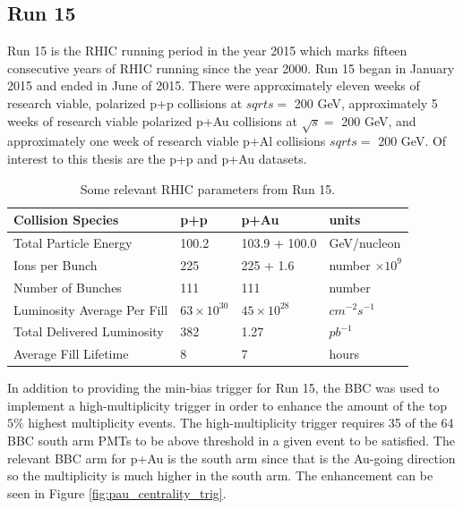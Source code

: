 \subsection{Run 15}
\label{sec:Run_15}
Run 15 is the RHIC running period in the year 2015  which marks fifteen consecutive years of RHIC running since the year 2000. Run 15 began in January 2015 and ended in June of 2015. There were approximately eleven weeks of research viable, polarized p+p collisions at $sqrt{s}=$ 200 GeV, approximately 5 weeks of research viable polarized p+Au collisions at $\sqrt{s}=$ 200 GeV, and approximately one week of research viable p+Al collisions $sqrt{s}=$ 200 GeV. Of interest to this thesis are the p+p and p+Au datasets. 
\begin{table}[h!]
\caption{Some relevant RHIC parameters from Run 15.}
\begin{center}
    \begin{tabular}{| l | l | l | l |}
    \hline
    Collision Species & p+p & p+Au & units\\ \hline
    Total Particle Energy & 100.2 & 103.9 + 100.0  & GeV/nucleon \\ \hline
    Ions per Bunch & 225 &  225 + 1.6 & number $\times10^{9}$ \\ \hline
    Number of Bunches & 111& 111 & number\\ \hline
    Luminosity Average Per Fill& $63\times10^{30}$ & $45 \times10^{28}$&$cm^{-2}s^{-1}$ \\ \hline
    Total Delivered Luminosity & 382  & 1.27 & $pb^{-1}$ \\ \hline
    Average Fill Lifetime & 8 & 7 & hours\\ \hline
    \end{tabular}
\end{center}
\end{table}

In addition to providing the min-bias trigger for Run 15, the BBC was used to implement a high-multiplicity trigger in order to enhance the amount of the top $5\%$ highest multiplicity events. The high-multiplicity trigger requires 35 of the 64 BBC south arm PMTs to be above threshold in a given event to be satisfied. The relevant BBC arm for p+Au is the south arm since that is the Au-going direction so the multiplicity is much higher in the south arm. The enhancement can be seen in Figure \ref{fig:pau_centrality_trig}. 


